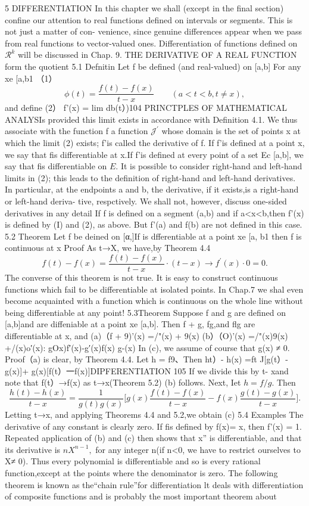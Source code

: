 5 DIFFERENTIATION In this chapter we shall (except in the final section) confine our attention to real functions defined on intervals or segments. This is not just a matter of con- venience, since genuine differences appear when we pass from real functions to vector-valued ones. Differentiation of functions defined on $\textstyle{\mathcal{R}}^{k}$ will be discussed in Chap. 9. THE DERIVATIVE OF A REAL FUNCTION form the quotient 5.1 Defnitin Let f be defined (and real-valued) on [a,b] For any xe [a,b1 （1） $$ \phi(t)={\frac{f(t)-f(x)}{t-x}}\qquad(a<t<b,t\neq x), $$ and define (2） f'(x) = lim db(t）)104 PRINCTPLES OF MATHEMATICAL ANALYSIs provided this limit exists in accordance with Definition 4.1. We thus associate with the function f a function ${\mathcal{J}}^{\prime}$ whose domain is the set of points x at which the limit (2) exists; f’is called the derivative of f. If f’is defined at a point x, we say that fis differentiable at x.If f’is defined at every point of a set Ec [a,b], we say that fis differentiable on $\textstyle E.$ It is possible to consider right-hand and left-hand limits in (2); this leads to the definition of right-hand and left-hand derivatives. In particular, at the endpoints a and b, the derivative, if it exists,is a right-hand or left-hand deriva- tive, respctively. We shall not, however, discuss one-sided derivatives in any detail If f is defined on a segment (a,b) and if a<x<b,then f'(x) is defined by (I) and (2), as above. But f'(a) and f(b) are not defined in this case. 5.2 Theorem Let f be deined on [α,]If is dfferentiable at a point xe [a, b1 then f is continuous at x Proof As t→X, we have,by Theorem 4.4 $$ f(t)-f(x)=\frac{f(t)-f(x)}{t-x}\cdot(t-x)\to f^{\prime}(x)\cdot0=0. $$ The converse of this theorem is not true. It is easy to construct continuous functions which fail to be differentiable at isolated points. In Chap.7 we shal even become acquainted with a function which is continuous on the whole line without being differentiable at any point! 5.3Theorem Suppose f and g are defined on [a,b]and are diffeniable at a point xe [a,b]. Then f + g, fg,and flg are differentiable at x, and (a)（f + 9)'(x) =/"(x) + 9(x) (b）（O)'(x) =/"(x)9(x) +/(x)o′(x): gOx)f′(x)-g′(x)f(x) g-(x) In (c), we assume of course that g(x) ≠ 0. Proof（a) is clear, by Theorem 4.4. Let h = f9、Then ht）- h(x) =ft J[g(t）- g(x)]+ g(x)[f(t）一f(x)]DIPFERENTIATION 105 If we divide this by t- xand note that f(t）→f(x) as t→x(Theorem 5.2) (b) follows. Next, Iet $h=f/g.$ Then $$ {\frac{h(t)-h(x)}{t-x}}={\frac{1}{g(t)g(x)}}\bigg[g(x){\frac{f(t)-f(x)}{t-x}}-f(x){\frac{g(t)-g(x)}{t-x}}\bigg]. $$ Letting t→x, and applying Theorems 4.4 and 5.2,we obtain (c) 5.4 Examples The derivative of any constant is clearly zero. If fis defined by f(x)= x, then f'(x) = 1. Repeated application of (b) and (c) then shows that x” is differentiable, and that its derivative is $n X^{n-1},$ for any integer n(if n<0, we have to restrict ourselves to X≠ 0). Thus every polynomial is differentiable and so is every rational function,except at the points where the denominator is zero. The following theorem is known as the“chain rule”for differentiation lt deals with differentiation of composite functions and is probably the most important theorem about 